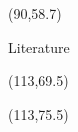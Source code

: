 \documentclass[final]{beamer}
\begin{document}
\begin{frame}{}
\begin{textblock}{27.5}(90,58.7)
\begin{block}{Literature}
\tiny


\end{block}
\end{textblock}

\begin{textblock}{10}(113,69.5)
\end{textblock}
\begin{textblock}{10}(113,75.5)
\end{textblock}

\end{frame}
\end{document}
